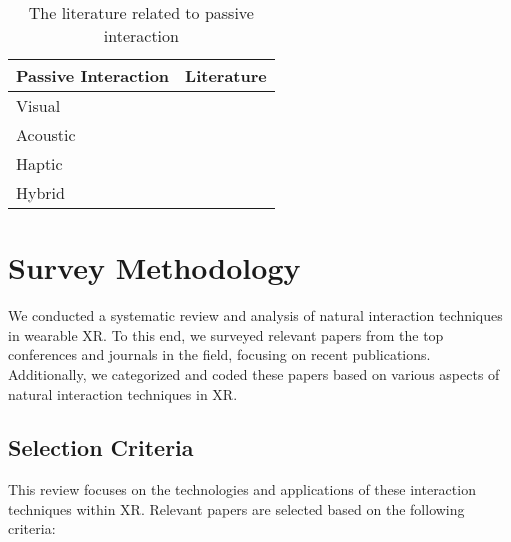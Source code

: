 \documentclass[review]{fcs}
\newcommand{\revise}[2]{\textcolor[rgb]{0,0,0}{#2}}
\begin{document}
\begin{table}[t]
    \centering
    \renewcommand\arraystretch{1.2}
    \caption{The literature related to passive interaction}
    \begin{tabular}{m{2.5cm}<{\centering}|m{4cm}<{\centering}}
    \hline
        \cellcolor{oBlue!80} Passive Interaction & \cellcolor{oPink!80} Literature \\ \hline
        \cellcolor{oBlue!30} Visual & \cite{DBLP:conf/chi/Pohlmann0MMB23}\cite{DBLP:conf/chi/MedlarLG24}\cite{DBLP:conf/chi/FeickR0K22}\cite{DBLP:conf/chi/WuQQCRS24}\cite{DBLP:conf/vr/YangQCSBLL24}\cite{DBLP:conf/chi/ElsharkawyAYAHK24}\cite{DBLP:conf/vr/LiLYTFX24}\cite{DBLP:conf/chi/RaschRS023}\cite{DBLP:conf/chi/TanX0SZHH24}\cite{DBLP:conf/vr/WangZF24}\cite{DBLP:conf/uist/Tao022}\cite{10462901}\cite{wang2024tasks} \\ \hline
        \cellcolor{oBlue!30} Acoustic & \cite{DBLP:conf/vr/YangQCSBLL24}\cite{DBLP:conf/chi/Pohlmann0MMB23}\cite{DBLP:conf/chi/ElsharkawyAYAHK24} \\ \hline
        \cellcolor{oBlue!30} Haptic & \cite{DBLP:conf/chi/ShenS022}\cite{DBLP:conf/chi/TatzgernDWCEDGH22}\cite{DBLP:conf/chi/0001OPSB24}\cite{DBLP:conf/vr/YamazakiH23}\cite{DBLP:conf/uist/ShenRM0S23}\cite{DBLP:conf/uist/JinguWS23}\cite{DBLP:conf/vr/SaintAubertAMPAL23} \\ \hline
        \cellcolor{oBlue!30} Hybrid  & \cite{DBLP:conf/chi/FeickR0K22}\cite{DBLP:conf/chi/Pohlmann0MMB23}\cite{DBLP:conf/chi/0001OPSB24} \\ \hline
    \end{tabular}
    \label{tab:table1}
\end{table}


\section{Survey Methodology}

We conducted a systematic review and analysis of natural interaction techniques in wearable XR. To this end, we surveyed relevant papers from the top conferences and journals in the field, focusing on recent publications. Additionally, we categorized and coded these papers based on various aspects of natural interaction techniques in XR.


\subsection{Selection Criteria}
\label{criteria}
This review focuses on the technologies and applications of these interaction techniques within XR. \revise{We selected relevant papers based on the following criteria}{Relevant papers are selected based on the following criteria}:
\end{document}
